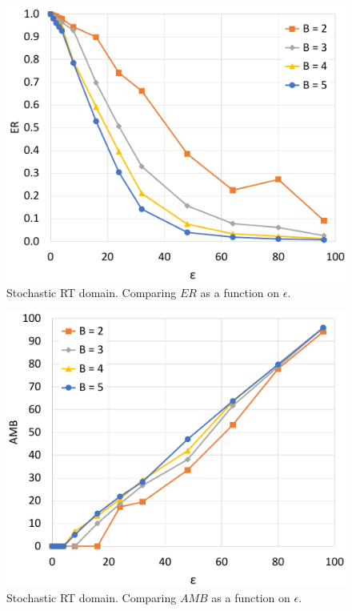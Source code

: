 \documentclass[letterpaper]{article} %
\newcommand{\amb}{\mathit{AMB}}
\newcommand{\er}{\mathit{ER}}
\begin{document}
\begin{figure}
	\centering
	\includegraphics[width=0.8\columnwidth]{Figures/Random_Trees_BAB_depth_chance2_er.pdf}
    \caption{Stochastic RT domain. Comparing $\er$ as a function on $\epsilon$.}
	\label{fig:exp-random-chance2}
\end{figure}
\begin{figure}
	\centering
	\includegraphics[width=0.8\columnwidth]{Figures/Random_Trees_BAB_depth_chance2_amb.pdf}
    \caption{Stochastic RT domain. Comparing $\amb$ as a function on $\epsilon$.}
	\label{fig:exp-random-chance1}
\end{figure}
\end{document}
